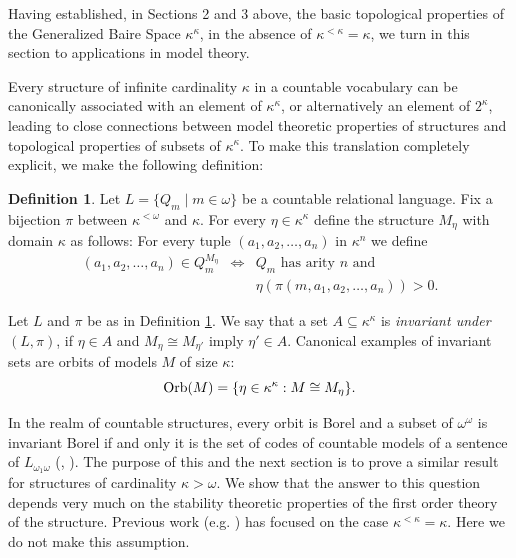 \documentclass[12pt,a4paper]{amsart}
\theoremstyle{definition}
\newtheorem{defn}[thm]{Definition}
\theoremstyle{remark}
\renewcommand{\mid}{\mathrel{|}\allowbreak}
\def\Orb{\mbox{\rm Orb}}
\begin{document}
Having established, in Sections 2 and 3 above, the basic topological properties of the Generalized Baire Space $\kappa^\kappa$, in the absence of $\kappa^{<\kappa}=\kappa$, we turn in this section to applications in model theory.

Every structure of infinite cardinality $\kappa$ in a countable vocabulary can be canonically associated with an element of $\kappa^\kappa$, or alternatively an element of $2^\kappa$, leading to close connections between model theoretic properties of structures and topological properties of subsets of $\kappa^\kappa$. To make this translation completely explicit, we make the following definition: 

\begin{defn}\label{struct}
Let $L=\{Q_m\mid m\in\omega\}$ be a countable relational language.
Fix a bijection $\pi$ between $\kappa^{<\omega}$ and $\kappa$. For every $\eta\in \kappa^\kappa$ define the structure $M_{\eta}$ with domain $\kappa$ as follows:
For every tuple $(a_1,a_2,\ldots , a_n)$ in $\kappa^n$ we define $$\begin{array}{lcl}
(a_1,a_2,\ldots , a_n)\in Q_m^{M_{\eta}}&\Leftrightarrow& Q_m \text{ has arity } n \text{ and }\\
&&\eta(\pi(m,a_1,a_2,\ldots,a_n))>0.\end{array}$$
\end{defn}

Let $L$ and $\pi$ be as in Definition \ref{struct}. We say that a set $A\subseteq \kappa^\kappa$ is \emph{invariant under} $(L,\pi)$, if $\eta\in A$ and $M_\eta\cong M_{\eta'}$ imply $\eta'\in A$. Canonical examples of invariant sets are  orbits of models $M$ of size $\kappa$:
$$\Orb(M)=\{\eta\in \kappa^\kappa:M\cong M_\eta\}.$$

In the realm of countable structures, every orbit is Borel and a subset of $\omega^\omega$ is invariant Borel if and only it is the set of codes of countable models of a sentence of $L_{\omega_1\omega}$  (\cite{MR200133},
\cite{MR188059}). The purpose of this and the next section is to prove a similar result for  structures of cardinality $\kappa>\omega$. We show that the answer to this question depends very much on the stability theoretic properties of the first order theory of the structure. Previous work (e.g. \cite{MR3235820}) has focused on the case $\kappa^{<\kappa}=\kappa$. Here we do not make this assumption. 
\end{document}
